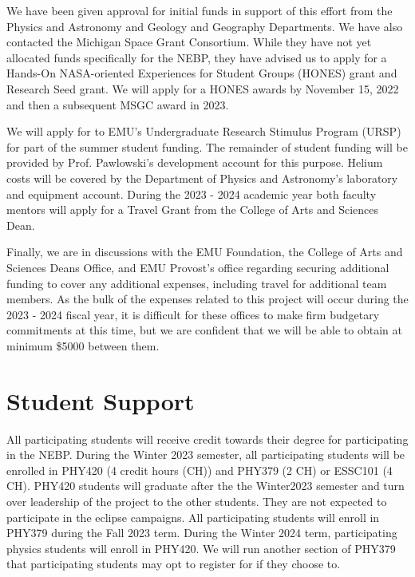 \documentclass[12pt]{article}
\begin{document}
We have been given approval for initial funds in support of this effort
from the Physics and Astronomy and 
Geology and Geography Departments.
We have also contacted the Michigan Space Grant Consortium. 
While they have not yet allocated funds specifically for the NEBP, they
have advised us to apply for a Hands-On NASA-oriented Experiences for Student Groups (HONES)
grant and Research Seed grant. We will apply for
a HONES awards by November 15, 2022 and then a subsequent MSGC award in 2023.

We will apply for to EMU's Undergraduate
Research Stimulus Program (URSP) for part of the summer student funding. The remainder
of  student funding will be provided by
Prof. Pawlowski's development account for this purpose.
Helium costs will be covered by the Department of Physics and Astronomy's laboratory
and equipment account. During the 2023 - 2024 academic year both faculty mentors will 
apply for a Travel Grant from the College of Arts and Sciences Dean.

Finally, we are in discussions with the EMU Foundation, the College of Arts and Sciences 
Deans Office, and EMU Provost's office regarding securing additional funding to cover 
any additional expenses, including travel for additional team members. As the bulk of the expenses related to this project will occur 
during the 2023 - 2024 fiscal year, it is difficult for these offices to make firm budgetary 
commitments at this time, but we are confident that we will be able to obtain at minimum 
\$5000 between them.






\newpage
\section{Student Support}
All participating students will receive credit towards their degree for
participating in the NEBP. During the Winter 2023 semester, all participating students
will be enrolled in PHY420 (4 credit hours (CH)) and PHY379 (2 CH) 
or ESSC101 (4 CH). PHY420 students will graduate after the the Winter2023 semester and 
turn over leadership of the project to the other students. They are not expected to 
 participate in the eclipse campaigns.
All participating students will enroll in PHY379 during the Fall 2023 term. During the 
Winter 2024 term, participating physics students will enroll in PHY420. We will run 
another section of PHY379 that participating students may opt to register for if they 
choose to.
\end{document}
